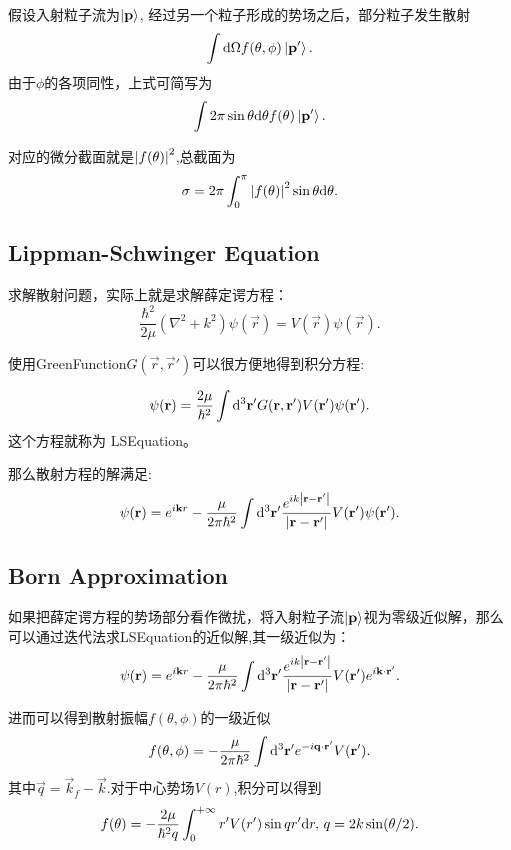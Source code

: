 假设入射粒子流为$\left|\mathbf{p}\right>$, 经过另一个粒子形成的势场之后，部分粒子发生散射$$\int\mathrm{d}\Omega f(\theta,\phi)\left|\mathbf{p}'\right>.$$
由于$\phi$的各项同性，上式可简写为
\begin{equation}
    \int 2\pi\sin\theta\mathrm{d}\theta f(\theta)\left|\mathbf{p}'\right>.
\end{equation}

对应的微分截面就是$\left|f(\theta)\right|^2$,总截面为
\begin{equation}
    \sigma=2\pi\int_0^\pi\left|f(\theta)\right|^2\sin\theta\mathrm{d}\theta.
\end{equation}

\subsection{Lippman-Schwinger Equation}
求解散射问题，实际上就是求解薛定谔方程：
\begin{equation}
    \frac{\hbar^2}{2\mu}(\nabla^2+k^2)\psi(\vec{r})=V(\vec{r})\psi(\vec{r}).
\end{equation}

使用\gls{GreenFunction}$G(\vec{r},\vec{r}')$可以很方便地得到积分方程:

\begin{equation}
    \psi(\mathbf{r})=\frac{2\mu}{\hbar^2}\int\mathrm{d}^3\mathbf{r}'G(\mathbf{r},\mathbf{r}')V(\mathbf{r}')\psi(\mathbf{r}').
\end{equation}
这个方程就称为 \gls{LSEquation}。

那么散射方程的解满足:
\begin{equation}
    \psi(\mathbf{r})=e^{i\mathbf{k}r}-\frac{\mu}{2\pi\hbar^2}\int\mathrm{d}^3\mathbf{r}'\frac{e^{ik\left|\mathbf{r}-\mathbf{r}'\right|}}{\left|\mathbf{r}-\mathbf{r}'\right|}V(\mathbf{r}')\psi(\mathbf{r}').
\end{equation}

\subsection{Born Approximation}
如果把薛定谔方程的势场部分看作微扰，将入射粒子流$\left|\mathbf{p}\right>$视为零级近似解，那么可以通过迭代法求\gls{LSEquation}的近似解,其一级近似为：
\begin{equation}
    \psi(\mathbf{r})=e^{i\mathbf{k}r}-\frac{\mu}{2\pi\hbar^2}\int\mathrm{d}^3\mathbf{r}'\frac{e^{ik\left|\mathbf{r}-\mathbf{r}'\right|}}{\left|\mathbf{r}-\mathbf{r}'\right|}V(\mathbf{r}')e^{i\mathbf{k}\cdot\mathbf{r}'}.
\end{equation}

进而可以得到散射振幅$f(\theta,\phi)$的一级近似
\begin{equation}
    f(\theta,\phi)=-\frac{\mu}{2\pi\hbar^2}\int\mathrm{d}^3\mathbf{r}'e^{-i\mathbf{q}\cdot\mathbf{r}'}V(\mathbf{r}').
\end{equation}
其中$\vec{q}=\vec{k}_f-\vec{k}$.对于中心势场$V(r)$,积分可以得到
\begin{equation}
    f(\theta)=-\frac{2\mu}{\hbar^2q}\int_0^{+\infty}r'V(r')\sin qr'\mathrm{d} r, \, q=2k\sin(\theta/2).
\end{equation}


